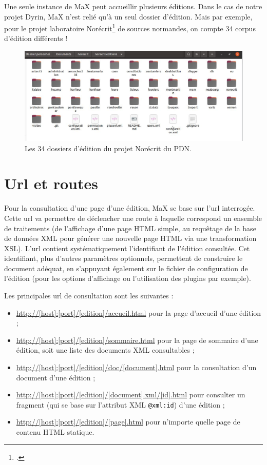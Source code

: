 \documentclass[a4paper,12pt,twoside]{book}
\begin{document}
Une seule instance de MaX peut accueillir plusieurs éditions. Dans le cas de notre projet Dyrin, MaX n'est relié qu'à un seul dossier d'édition. Mais par exemple, pour le projet laboratoire Norécrit\footcite{norecrit} de sources normandes, on compte 34 corpus d'édition différents !

\begin{figure}[H]
    \centering
    \includegraphics[width=12cm]{img/partie_2/norecrit.JPG}
    \caption{Les 34 dossiers d'édition du projet Norécrit du \acrshort{PDN}.}
\end{figure}

\section{Url et routes}
Pour la consultation d'une page d'une édition, MaX se base sur l'url interrogée. Cette url va permettre de déclencher une route à laquelle correspond un ensemble de traitements (de l'affichage d'une page \acrshort{HTML} simple, au requêtage de la base de données \acrshort{XML} pour générer une nouvelle page \acrshort{HTML} via une transformation \acrshort{XSL}). L'url contient systématiquement l'identifiant de l'édition consultée. Cet identifiant, plus d'autres paramètres optionnels, permettent de construire le document adéquat, en s'appuyant également sur le fichier de configuration de l'édition (pour les options d'affichage ou l'utilisation des plugins par exemple).

Les principales url de consultation sont les suivantes :

\begin{itemize}
    \item \url{http://[host]:[port]/[edition]/accueil.html} pour la page d'accueil d'une édition ;
    \item \url{http://[host]:[port]/[edition]/sommaire.html} pour la page de sommaire d'une édition, soit une liste des documents XML consultables ;
    \item \url{http://[host]:[port]/[edition]/doc/[document].html} pour la consultation d'un document d'une édition ;
    \item \url{http://[host]:[port]/[edition]/[document].xml/[id].html} pour consulter un fragment (qui se base sur l'attribut XML \texttt{@xml:id}) d'une édition ;
    \item \url{http://[host]:[port]/[edition]/[page].html} pour n'importe quelle page de contenu \acrshort{HTML} statique.
\end{itemize}
\end{document}
